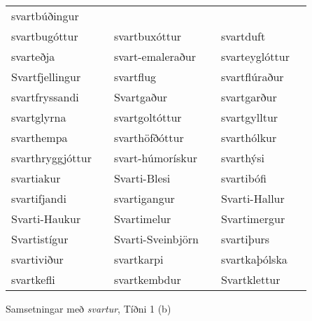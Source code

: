 \documentclass[../samsetningasafn.tex]{subfiles}
\begin{document}
\begin{wordlist}[H]
\begin{tcolorbox}
\begin{tabular}{BlBlBl}
		svartbúðingur		&		\\  %
		svartbugóttur		&		& 
		svartbuxóttur		&		& 
		svartduft			&		\\  %
		svarteðja			&		& 
		svart-emaleraður	&		& 
		svarteyglóttur		&		\\  %
		Svartfjellingur		&		& 
		svartflug			&		& 
		svartflúraður		&		\\  %
		svartfryssandi		&		& 
		Svartgaður		&		& 
		svartgarður		&		\\  %
		svartglyrna		&		& 
		svartgoltóttur		&		& 
		svartgylltur		&		\\  %
		svarthempa		&		& 
		svarthöfðóttur		&		& 
		svarthólkur		&		\\  %
		svarthryggjóttur	&		& 
		svart-húmorískur	&		& 
		svarthýsi			&		\\  %
		svartiakur			&		& 
		Svarti-Blesi		&		& 
		svartibófi			&		\\  %
		svartifjandi		&		& 
		svartigangur		&		& 
		Svarti-Hallur		&		\\  %
		Svarti-Haukur		&		& 
		Svartimelur		&		& 	
		Svartimergur		&		\\  %
		Svartistígur		&		& 
		Svarti-Sveinbjörn	&		& 
		svartiþurs			&		\\  %
		svartiviður		& 		& 
		svartkarpi			&		& 
		svartkaþólska		&		\\  %
		svartkefli			&		& 
		svartkembdur		&		& 
		Svartklettur		& 		 %
	\end{tabular}
\end{tcolorbox}
	\caption{Samsetningar með \textit{svartur}, Tíðni 1 (b)}
	\label{listi:svart.1b}
\end{wordlist}	
\end{document}
